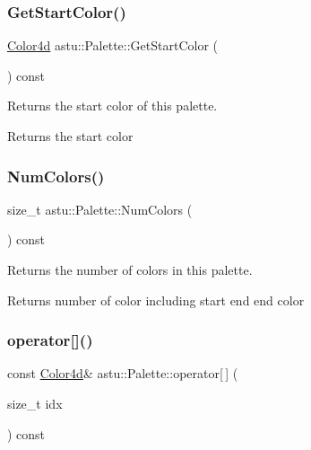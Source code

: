\subsubsection{\texorpdfstring{Get\+Start\+Color()}{GetStartColor()}}
{\footnotesize\ttfamily \hyperlink{classastu_1_1Color}{Color4d} astu\+::\+Palette\+::\+Get\+Start\+Color (\begin{DoxyParamCaption}{ }\end{DoxyParamCaption}) const}

Returns the start color of this palette.

\begin{DoxyReturn}{Returns}
the start color 
\end{DoxyReturn}
\mbox{\label{classastu_1_1Palette_af99ff2f3a95466072070d6bb2b401587}} 
\subsubsection{\texorpdfstring{Num\+Colors()}{NumColors()}}
{\footnotesize\ttfamily size\+\_\+t astu\+::\+Palette\+::\+Num\+Colors (\begin{DoxyParamCaption}{ }\end{DoxyParamCaption}) const\hspace{0.3cm}{\ttfamily [inline]}}

Returns the number of colors in this palette.

\begin{DoxyReturn}{Returns}
number of color including start end end color 
\end{DoxyReturn}
\mbox{\label{classastu_1_1Palette_a1dccfd3d766edbbf64dabb010f9679e0}} 
\subsubsection{\texorpdfstring{operator[]()}{operator[]()}}
{\footnotesize\ttfamily const \hyperlink{classastu_1_1Color}{Color4d}\& astu\+::\+Palette\+::operator\mbox{[}$\,$\mbox{]} (\begin{DoxyParamCaption}\item[{size\+\_\+t}]{idx }\end{DoxyParamCaption}) const}

